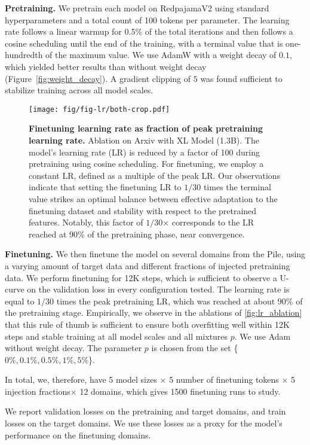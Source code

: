 \textbf{Pretraining.} We pretrain each model on RedpajamaV2 using standard hyperparameters and a total count of 100 tokens per parameter. The learning rate follows a linear warmup for 0.5\% of the total iterations and then follows a cosine scheduling until the end of the training, with a terminal value that is one-hundredth of the maximum value. We use AdamW with a weight decay of $0.1$, which yielded better results than without weight decay (Figure~\ref{fig:weight_decay}). A gradient clipping of $5$ was found sufficient to stabilize training across all model scales.  
\begin{figure}[t]
    \centering
    \texttt{[image: fig/fig-lr/both-crop.pdf]}
    \caption{\textbf{Finetuning learning rate as fraction of peak pretraining learning rate.} Ablation on Arxiv with XL Model (1.3B). The model's learning rate (LR) is reduced by a factor of 100 during pretraining using cosine scheduling. For finetuning, we employ a constant LR, defined as a multiple of the peak LR. Our observations indicate that setting the finetuning LR to $1/30$ times the terminal value strikes an optimal balance between effective adaptation to the finetuning dataset and stability with respect to the pretrained features. Notably, this factor of $1/30$× corresponds to the LR reached at 90\% of the pretraining phase, near convergence.}
    \label{fig:lr_ablation}
\end{figure}

\textbf{Finetuning.}  We then finetune the model on several domains from the Pile, using a varying amount of target data and different fractions of injected pretraining data.
We perform finetuning for 12K steps, which is sufficient to observe a U-curve on the validation loss in every configuration tested. 
The learning rate is equal to $1/30$ times the peak pretraining LR, which was reached at about $90\%$ of the pretraining stage.  Empirically, we observe in the ablations of \autoref{fig:lr_ablation} that this rule of thumb is sufficient to ensure both overfitting well within 12K steps and stable training at all model scales and all mixtures $p$. We use Adam without weight decay. The parameter $p$ is chosen from the set \{$0\%, 0.1\%, 0.5\%, 1\%, 5\%$\}.  

In total, we, therefore, have 5 model sizes $\times$ 5 number of finetuning tokens $\times$ 5 injection fractions$\times$ 12 domains, which gives 1500 finetuning runs to study.      

We report validation losses on the pretraining and target domains, and train losses on the target domains. We use these losses as a proxy for the model's performance on the finetuning domains.


